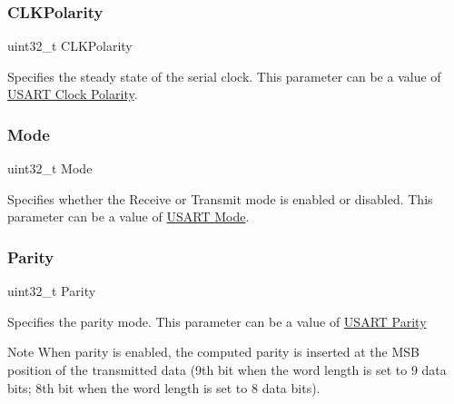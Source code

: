 \subsubsection{\texorpdfstring{C\+L\+K\+Polarity}{CLKPolarity}}
{\footnotesize\ttfamily uint32\+\_\+t C\+L\+K\+Polarity}

Specifies the steady state of the serial clock. This parameter can be a value of \hyperlink{group___u_s_a_r_t___clock___polarity}{U\+S\+A\+RT Clock Polarity}. \mbox{\label{struct_u_s_a_r_t___init_type_def_a0ffc93ec511ed9cf1663f6939bd3e839}} 
\subsubsection{\texorpdfstring{Mode}{Mode}}
{\footnotesize\ttfamily uint32\+\_\+t Mode}

Specifies whether the Receive or Transmit mode is enabled or disabled. This parameter can be a value of \hyperlink{group___u_s_a_r_t___mode}{U\+S\+A\+RT Mode}. \mbox{\label{struct_u_s_a_r_t___init_type_def_a1d60a99b8f3965f01ab23444b154ba79}} 
\subsubsection{\texorpdfstring{Parity}{Parity}}
{\footnotesize\ttfamily uint32\+\_\+t Parity}

Specifies the parity mode. This parameter can be a value of \hyperlink{group___u_s_a_r_t___parity}{U\+S\+A\+RT Parity} \begin{DoxyNote}{Note}
When parity is enabled, the computed parity is inserted at the M\+SB position of the transmitted data (9th bit when the word length is set to 9 data bits; 8th bit when the word length is set to 8 data bits). 
\end{DoxyNote}
\mbox{\label{struct_u_s_a_r_t___init_type_def_a8394ba239444e3e5fe1ada1c37cb1019}} 
